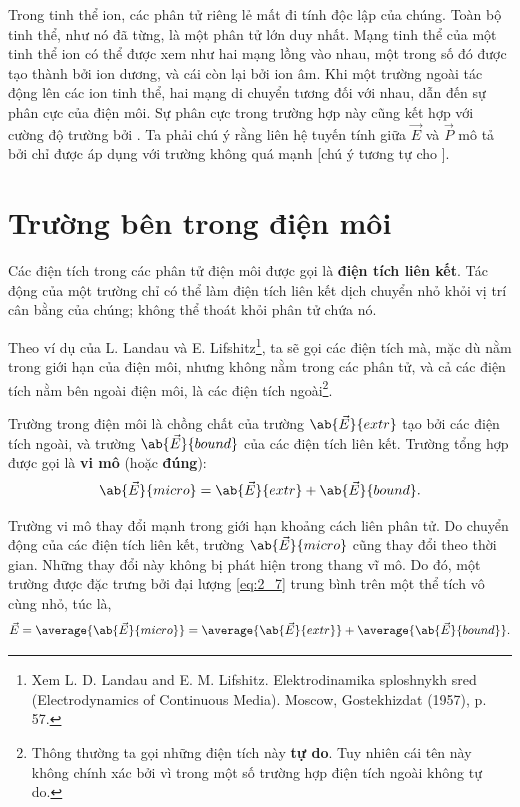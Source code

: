 Trong tinh thể ion, các phân tử riêng lẻ mất đi tính độc lập của chúng. Toàn bộ tinh thể, như nó đã từng, là một phân tử lớn duy nhất. Mạng tinh thể của một tinh thể ion có thể được xem như hai mạng lồng vào nhau, một trong số đó được tạo thành bởi ion dương, và cái còn lại bởi ion âm. Khi một trường ngoài tác động lên các ion tinh thể, hai mạng di chuyển tương đối với nhau, dẫn đến sự phân cực của điện môi. Sự phân cực trong trường hợp này cũng kết hợp với cường độ trường bởi . Ta phải chú ý rằng liên hệ tuyến tính giữa $\vec{E}$ và $\vec{P}$ mô tả bởi  chỉ được áp dụng với trường không quá mạnh [chú ý tương tự cho ].

\section{Trường bên trong điện môi}\label{sec:2_3}

Các điện tích trong các phân tử điện môi được gọi là \textbf{điện tích liên kết}. Tác động của một trường chỉ có thể làm điện tích liên kết dịch chuyển nhỏ khỏi vị trí cân bằng của chúng; không thể thoát khỏi phân tử chứa nó.

Theo ví dụ của L. Landau và E. Lifshitz\footnote{Xem L. D. Landau and E. M. Lifshitz. Elektrodinamika sploshnykh sred (Electrodynamics of Continuous Media). Moscow, Gostekhizdat (1957), p. 57.}, ta sẽ gọi các điện tích mà, mặc dù nằm trong giới hạn của điện môi, nhưng không nằm trong các phân tử, và cả các điện tích nằm bên ngoài điện môi, là các điện tích ngoài\footnote{Thông thường ta gọi những điện tích này \textbf{tự do}. Tuy nhiên cái tên này không chính xác bởi vì trong một số trường hợp điện tích ngoài không tự do.}.

Trường trong điện môi là chồng chất của trường $\ab{\vec{E}}{extr}$ tạo bởi các điện tích ngoài, và trường $\ab{\vec{E}}{bound}$ của các điện tích liên kết. Trường tổng hợp được gọi là \textbf{vi mô} (hoặc \textbf{đúng}):
\begin{equation}\label{eq:2_7}
    \ab{\vec{E}}{micro} = \ab{\vec{E}}{extr} + \ab{\vec{E}}{bound}.
\end{equation}

Trường vi mô thay đổi mạnh trong giới hạn khoảng cách liên phân tử. Do chuyển động của các điện tích liên kết, trường $\ab{\vec{E}}{micro}$ cũng thay đổi theo thời gian. Những thay đổi này không bị phát hiện trong thang vĩ mô. Do đó, một trường được đặc trưng bởi đại lượng \eqref{eq:2_7} trung bình trên một thể tích vô cùng nhỏ, túc là,
\begin{equation*}
    \vec{E} = \average{\ab{\vec{E}}{micro}} = \average{\ab{\vec{E}}{extr}} + \average{\ab{\vec{E}}{bound}}.
\end{equation*}

